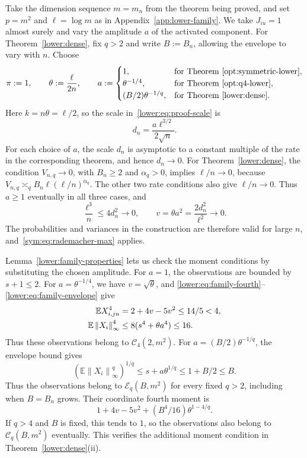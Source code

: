 \documentclass[11pt,letterpaper]{article}
\newenvironment{recovered}{}{}
\theoremstyle{remark}
\newcommand{\E}{\mathbb E}
\newcommand{\norm}[1]{\left\lVert#1\right\rVert}
\begin{document}
Take the dimension sequence \(m=m_n\) from the theorem being
proved, and set \(p=m^2\) and \(\ell=\log m\) as in
Appendix~\ref{app:lower-family}. We take \(J_{iu}=1\) almost surely
and vary the amplitude \(a\) of the activated component.
For Theorem~\ref{lower:dense}, fix \(q>2\) and write
\(B:=B_n\), allowing the envelope to vary with \(n\).
Choose
\[
 \pi:=1,\qquad \theta:=\frac{\ell}{2n},\qquad
 a:=\begin{cases}
 1,&\text{for Theorem~\ref{opt:symmetric-lower}},\\
 \theta^{-1/4},&\text{for Theorem~\ref{opt:q4-lower}},\\
 (B/2)\theta^{-1/q},&\text{for Theorem~\ref{lower:dense}}.
 \end{cases}
\]
Here \(k=n\theta=\ell/2\), so
the scale in~\eqref{lower:eq:proof-scale} is
\[
 d_n=\frac{a\ell^{3/2}}{2\sqrt n}.
\]
For each choice of \(a\), the scale \(d_n\) is asymptotic to a constant multiple of the
rate in the corresponding theorem, and hence \(d_n\to0\).
\begin{recovered}
For Theorem~\ref{lower:dense}, the condition \(V_{n,q}\to0\),
with \(B_n\ge2\) and \(\alpha_q>0\), implies \(\ell/n\to0\),
because \(V_{n,q}\asymp_q B_n\ell(\ell/n)^{\alpha_q}\).
The other two rate conditions also give \(\ell/n\to0\).
Thus \(a\ge1\) eventually in all three cases, and
\[
 \frac{\ell^3}{n}\le4d_n^2\to0,\qquad
 v=\theta a^2=\frac{2d_n^2}{\ell^2}\to0.
\]
\end{recovered}
The probabilities and variances in the construction are therefore valid
for large \(n\), and~\eqref{sym:eq:rademacher-max} applies.

\begin{recovered}
Lemma~\ref{lower:family-properties} lets us check the moment
conditions by substituting the chosen amplitude.
\end{recovered}
For \(a=1\), the observations are bounded by \(s+1\le2\).
For \(a=\theta^{-1/4}\), we have \(v=\sqrt\theta\), and
\eqref{lower:eq:family-fourth}--\eqref{lower:eq:family-envelope} give
\begin{align}
 \E X_{i,ju}^4&=2+4v-5v^2\le14/5<4,\notag\\
 \E\norm{X_i}_\infty^4
 &\le8(s^4+\theta a^4)\le16.
 \label{sym:eq:q4-moments}
\end{align}
Thus these observations belong to \(\mathcal C_4(2,m^2)\).
\begin{recovered}
For \(a=(B/2)\theta^{-1/q}\), the envelope bound gives
\[
 (\E\norm{X_i}_\infty^q)^{1/q}\le s+a\theta^{1/q}
 \le1+B/2\le B.
\]
Thus the observations belong to \(\mathcal E_q(B,m^2)\) for every
fixed \(q>2\), including when \(B=B_n\) grows.
Their coordinate fourth moment is
\[
 1+4v-5v^2+(B^4/16)\theta^{1-4/q}.
\]
If \(q>4\) and \(B\) is fixed, this tends to \(1\), so the
observations also belong to \(\mathcal C_q(B,m^2)\) eventually.
This verifies the additional moment condition in
Theorem~\ref{lower:dense}\textup{(ii)}.
\end{recovered}
\end{document}
